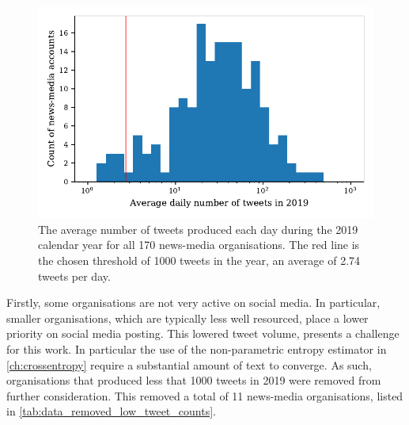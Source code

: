 \begin{figure}[!htbp]
	\centering
	\includegraphics{chapter1/figs/averagetweetactivity}
	\caption{The average number of tweets produced each day during the 2019 calendar year for all 170 news-media organisations. The red line is the chosen threshold of 1000 tweets in the year, an average of 2.74 tweets per day.}
	\label{fig:data_cleaning_average_tweet_activity}
\end{figure}

Firstly, some organisations are not very active on social media. In particular, smaller organisations, which are typically less well resourced, place a lower priority on social media posting. This lowered tweet volume, presents a challenge for this work. In particular the use of the non-parametric entropy estimator in \autoref{ch:crossentropy} require a substantial amount of text to converge. As such, organisations that produced less that 1000 tweets in 2019 were removed from further consideration. This removed a total of 11 news-media organisations, listed in  \autoref{tab:data_removed_low_tweet_counts}.


